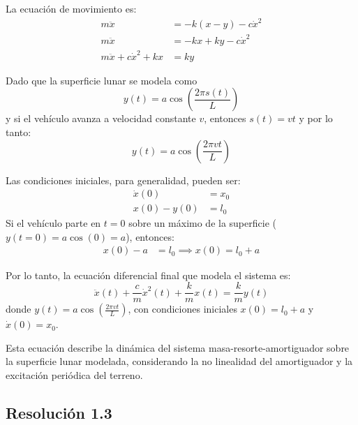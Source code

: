 \documentclass[
  11pt,
  letterpaper,
   addpoints,
   answers
  ]{exam}
\begin{document}
\begin{questions}
\begin{solution}
La ecuación de movimiento es:
\begin{align}
  m\ddot{x} &= -k(x - y) - c\dot{x}^2\\
  m\ddot{x} &= -kx + ky - c\dot{x}^2 \\
  m\ddot{x} + c\dot{x}^2 + kx &= ky
\end{align}

Dado que la superficie lunar se modela como
\begin{equation}
  y(t) = a\cos\left(\frac{2\pi s(t)}{L}\right)
\end{equation}
y si el vehículo avanza a velocidad constante $v$, entonces $s(t) = vt$ y por lo tanto:
\begin{equation}
  y(t) = a\cos\left(\frac{2\pi v t}{L}\right)
\end{equation}

Las condiciones iniciales, para generalidad, pueden ser:
\begin{align}
  \dot{x}(0) &= x_0 \\
  x(0) - y(0) &= l_0
\end{align}
Si el vehículo parte en $t=0$ sobre un máximo de la superficie ($y(t=0) =a\cos(0) = a$), entonces:
\begin{align}
  x(0) - a &= l_0 \implies x(0) = l_0 + a
\end{align}

Por lo tanto, la ecuación diferencial final que modela el sistema es:
\begin{equation}
  \boxed{
    \ddot{x}(t) + \frac{c}{m} \dot{x}^2(t) + \frac{k}{m} x(t) = \frac{k}{m} y(t)
  }
\end{equation}
donde $y(t) = a\cos\left(\frac{2\pi v t}{L}\right)$, con condiciones iniciales $x(0) = l_0 + a$ y $\dot{x}(0) = x_0$.

Esta ecuación describe la dinámica del sistema masa-resorte-amortiguador sobre la superficie lunar modelada, considerando la no linealidad del amortiguador y la excitación periódica del terreno.

\subsection*{Resolución 1.3}



\end{solution}
\end{questions}
\end{document}
